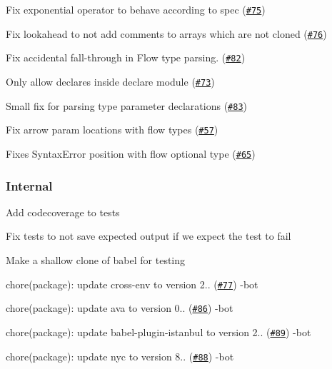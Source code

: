 \begin{DoxyItemize}
\item Fix exponential operator to behave according to spec (\href{https://github.com/babel/babylon/pull/75}{\tt \#75}) 
\item Fix lookahead to not add comments to arrays which are not cloned (\href{https://github.com/babel/babylon/pull/76}{\tt \#76}) 
\item Fix accidental fall-\/through in Flow type parsing. (\href{https://github.com/babel/babylon/pull/82}{\tt \#82}) 
\item Only allow declares inside declare module (\href{https://github.com/babel/babylon/pull/73}{\tt \#73}) 
\item Small fix for parsing type parameter declarations (\href{https://github.com/babel/babylon/pull/83}{\tt \#83}) 
\item Fix arrow param locations with flow types (\href{https://github.com/babel/babylon/pull/57}{\tt \#57}) 
\item Fixes Syntax\+Error position with flow optional type (\href{https://github.com/babel/babylon/pull/65}{\tt \#65}) 
\end{DoxyItemize}

\subsubsection*{Internal}


\begin{DoxyItemize}
\item Add codecoverage to tests 
\item Fix tests to not save expected output if we expect the test to fail 
\item Make a shallow clone of babel for testing 
\item chore(package)\+: update cross-\/env to version 2.. (\href{https://github.com/babel/babylon/pull/77}{\tt \#77}) -\/bot
\item chore(package)\+: update ava to version 0.. (\href{https://github.com/babel/babylon/pull/86}{\tt \#86}) -\/bot
\item chore(package)\+: update babel-\/plugin-\/istanbul to version 2.. (\href{https://github.com/babel/babylon/pull/89}{\tt \#89}) -\/bot
\item chore(package)\+: update nyc to version 8.. (\href{https://github.com/babel/babylon/pull/88}{\tt \#88}) -\/bot
\end{DoxyItemize}

